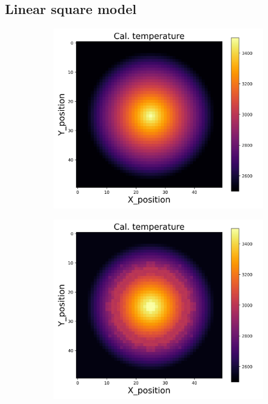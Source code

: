 {\newpage
\subsection{Linear square model}
\begin{figure}[h]
    \centering
    \begin{minipage}{\textwidth}
        \centering
        \begin{subfigure}{0.27\textwidth}
            \centering
            \includegraphics[width=\textwidth]{figures/raw_data/0/T3500/lin_square/T_cal.jpg}
        \end{subfigure}
        \begin{subfigure}{0.27\textwidth}
            \centering
            \includegraphics[width=\textwidth]{figures/raw_data/5/T3500/lin_square/T_cal.jpg}

\end{subfigure}
\end{minipage}
\end{figure}}
